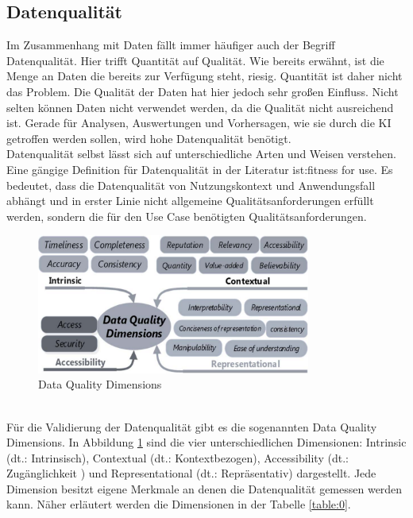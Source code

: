 \begin{onehalfspace}
    \subsection{Datenqualität}
    \label{subsubsec:datenqualität}
        Im Zusammenhang mit Daten fällt immer häufiger auch der Begriff Datenqualität. Hier trifft Quantität auf Qualität. Wie bereits erwähnt, ist die Menge an Daten die bereits zur Verfügung steht, riesig. Quantität ist daher nicht das Problem. Die Qualität der Daten hat hier jedoch sehr großen Einfluss. Nicht selten können Daten nicht verwendet werden, da die Qualität nicht ausreichend ist. Gerade für Analysen, Auswertungen und Vorhersagen, wie sie durch die \ac*{KI} getroffen werden sollen, wird hohe Datenqualität benötigt.\cite{Byabazaire2020}
        \\
        Datenqualität selbst lässt sich auf unterschiedliche Arten und Weisen verstehen.\cite{Yalaoui2021} Eine gängige Definition für Datenqualität in der Literatur ist:\glqq{}fitness for use\grqq{}.\cite{Faroukhi2020} Es bedeutet, dass die Datenqualität von Nutzungskontext und Anwendungsfall abhängt und in erster Linie nicht allgemeine Qualitätsanforderungen erfüllt werden, sondern die für den Use Case benötigten Qualitätsanforderungen.\cite{Faroukhi2020}\cite{Yalaoui2021}
        \begin{figure}[h]
            \centering
            \includegraphics[width = 9cm]{Bilder/Data_quality_dimensions.png}
            \caption{Data Quality Dimensions \cite{Taleb2018}}
            \label{fig:DataQualityDimensions}
        \end{figure}
        \\
        Für die Validierung der Datenqualität gibt es die sogenannten Data Quality Dimensions. In Abbildung \ref{fig:DataQualityDimensions} sind die vier unterschiedlichen Dimensionen: Intrinsic (\ac{dt}.: Intrinsisch), Contextual (\ac{dt}.: Kontextbezogen), Accessibility (\ac{dt}.: Zugänglichkeit ) und Representational (\ac{dt}.: Repräsentativ) dargestellt. Jede Dimension besitzt eigene Merkmale an denen die Datenqualität gemessen werden kann. Näher erläutert werden die Dimensionen in der Tabelle \ref*{table:0}.

\end{onehalfspace}
